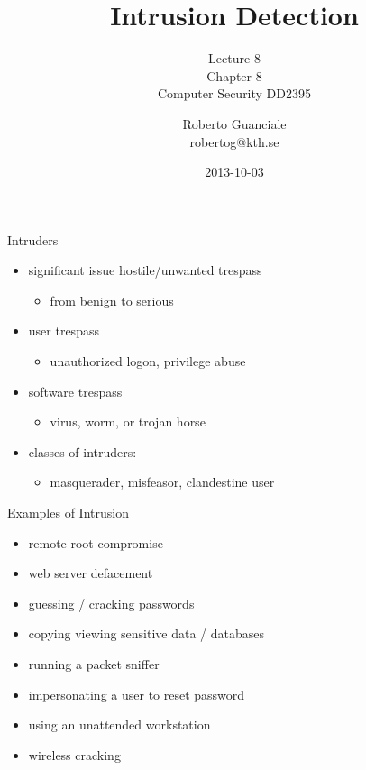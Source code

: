 \documentclass{beamer}
\title{Intrusion Detection}
\subtitle{Lecture 8 \\ Chapter 8\\Computer Security DD2395}
\author[R. Guanciale]{
  Roberto Guanciale\\
  robertog@kth.se
}
\date{2013-10-03}
\begin{document}
\begin{frame}[plain]
  \titlepage
\end{frame}

\begin{frame}{Intruders}
  \begin{itemize}
  \item significant issue hostile/unwanted trespass 
    \begin{itemize}
    \item from benign to serious 
    \end{itemize}
  \item user trespass 
    \begin{itemize}
    \item unauthorized logon, privilege abuse 
    \end{itemize}
  \item software trespass 
      \begin{itemize}
      \item virus, worm, or trojan horse 
    \end{itemize}
  \item classes of intruders: 
      \begin{itemize}
      \item masquerader, misfeasor, clandestine user
    \end{itemize}
  \end{itemize}
\end{frame}

\begin{frame}{Examples of Intrusion}
  \begin{itemize}
  \item remote root compromise 
  \item web server defacement 
  \item guessing / cracking passwords 
  \item copying viewing sensitive data / databases 
  \item running a packet sniffer 
  \item impersonating a user to reset password 
  \item using an unattended workstation 
  \item wireless cracking
  \end{itemize}
\end{frame}
\end{document}
